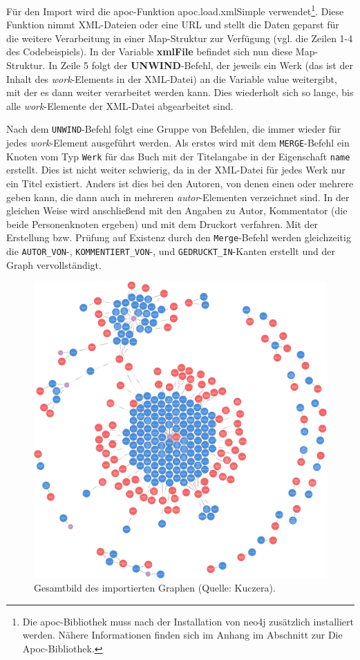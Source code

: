 Für den Import wird die apoc-Funktion apoc.load.xmlSimple
verwendet\footnote{Die apoc-Bibliothek muss nach der Installation von
  neo4j zusätzlich installiert werden. Nähere Informationen finden sich
  im Anhang im Abschnitt zur Die Apoc-Bibliothek.}. Diese Funktion nimmt
XML-Dateien oder eine URL und stellt die Daten geparst für die weitere
Verarbeitung in einer Map-Struktur zur Verfügung (vgl. die Zeilen 1-4
des Codebeispiels). In der Variable \textbf{xmlFile} befindet sich nun
diese Map-Struktur. In Zeile 5 folgt der \textbf{UNWIND}-Befehl, der
jeweils ein Werk (das ist der Inhalt des \emph{work}-Elements in der
XML-Datei) an die Variable value weitergibt, mit der es dann weiter
verarbeitet werden kann. Dies wiederholt sich so lange, bis alle
\emph{work}-Elemente der XML-Datei abgearbeitet sind.

Nach dem \texttt{UNWIND}-Befehl folgt eine Gruppe von Befehlen, die
immer wieder für jedes \emph{work}-Element ausgeführt werden. Als erstes
wird mit dem \texttt{MERGE}-Befehl ein Knoten vom Typ \texttt{Werk} für
das Buch mit der Titelangabe in der Eigenschaft \texttt{name} erstellt.
Dies ist nicht weiter schwierig, da in der XML-Datei für jedes Werk nur
ein Titel existiert. Anders ist dies bei den Autoren, von denen einen
oder mehrere geben kann, die dann auch in mehreren
\emph{autor}-Elementen verzeichnet sind. In der gleichen Weise wird
anschließend mit den Angaben zu Autor, Kommentator (die beide
Personenknoten ergeben) und mit dem Druckort verfahren. Mit der
Erstellung bzw. Prüfung auf Existenz durch den \texttt{Merge}-Befehl
werden gleichzeitig die \texttt{AUTOR\_VON}-,
\texttt{KOMMENTIERT\_VON}-, und \texttt{GEDRUCKT\_IN}-Kanten erstellt
und der Graph vervollständigt.

\begin{figure}
\centering
\includegraphics{Bilder/Kollatz-Druckernetzwerk.png}
\caption{Gesamtbild des importierten Graphen (Quelle: Kuczera).}
\end{figure}

